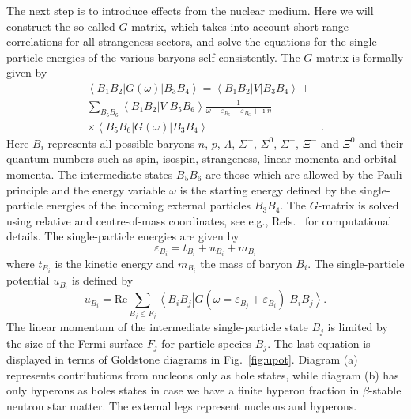 The next step is to introduce effects from the nuclear medium. 
Here we will construct the so-called $G$-matrix, which
takes into account short-range correlations for all strangeness
sectors, and solve the equations for the single-particle energies 
of the various baryons self-consistently.
The $G$-matrix is formally given by 
\begin{eqnarray}
   \left\langle B_1B_2\right |G(\omega)\left | B_3B_4 \right\rangle=
   \left\langle B_1B_2\right |V\left | B_3B_4 \right\rangle+&\nonumber\\
   \sum_{B_5B_6}\left\langle B_1B_2\right |V\left | B_5B_6 \right\rangle
   \frac{1}{\omega-\varepsilon_{B_5}-\varepsilon_{B_6}+ \imath\eta}&\nonumber\\
   \times\left\langle B_5B_6\right |G(\omega)\left | B_3B_4 \right\rangle&.
   \label{eq:gmatrix}
\end{eqnarray}
Here $B_i$ represents all possible baryons $n$, $p$, $\Lambda$, $\Sigma^{-}$,
$\Sigma^0$, $\Sigma^+$, $\Xi^-$ and $\Xi^0$ and their quantum numbers
such as spin, isospin, strangeness, linear momenta and orbital momenta.
The intermediate states $B_5B_6$ are those which are allowed by
the Pauli principle and the energy variable $\omega$ is the starting energy
defined by the single-particle energies 
of the incoming external particles $B_3B_4$.
The $G$-matrix is solved using relative and centre-of-mass coordinates,
see e.g., Refs.~\cite{sl99,isaac99} for computational details.
The single-particle energies are given by
\begin{equation}
      \varepsilon_{B_i}=t_{B_i} + u_{B_i} +m_{B_i}
       \label{eq:spenergy}
\end{equation} 
where $t_{B_i}$ is the kinetic energy and $m_{B_i}$ 
the mass of baryon ${B_i}$. The
single-particle potential $u_{B_i}$ is defined by  
\begin{equation} 
       u_{B_i}=\mathrm{Re} \sum_{B_j\leq F_j}
       \left\langle B_iB_j\right |
       G(\omega=\varepsilon_{B_j}+\varepsilon_{B_i})
       \left | B_iB_j \right\rangle.
\end{equation}
The linear momentum of the intermediate 
single-particle state $B_j$ is limited by the size of the Fermi surface 
$F_j$ for particle species $B_j$. 
The last equation is displayed in terms of Goldstone diagrams 
in Fig.\ \ref{fig:upot}. Diagram (a) represents contributions
from nucleons only as hole states, while diagram (b) 
has only hyperons as holes states in case we have a finite hyperon
fraction in $\beta$-stable neutron star matter. The external legs
represent nucleons and hyperons.  

